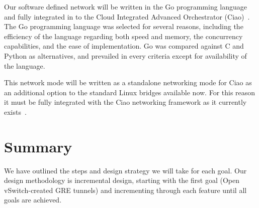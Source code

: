\documentclass[10pt,letterpaper,onecolumn,journal]{IEEEtran}
\begin{document}
Our software defined network will be written in the Go programming language and
fully integrated in to the Cloud Integrated Advanced Orchestrator
(Ciao)~\cite{ciao}. The Go programming language was selected for
several reasons, including the efficiency of the language regarding both speed
and memory, the concurrency capabilities, and the ease of implementation. Go was
compared against C and Python as alternatives, and prevailed in every criteria
except for availability of the language.

This network mode will be written as a standalone networking mode for Ciao as an
additional option to the standard Linux bridges available now. For this reason
it must be fully integrated with the Ciao networking framework as it currently
exists~\cite{ciaoNetworking}.

\section{Summary}
We have outlined the steps and design strategy we will take for each goal. Our
design methodology is incremental design, starting with the first goal (Open
vSwitch-created GRE tunnels) and incrementing through each feature until all
goals are achieved.
\end{document}
